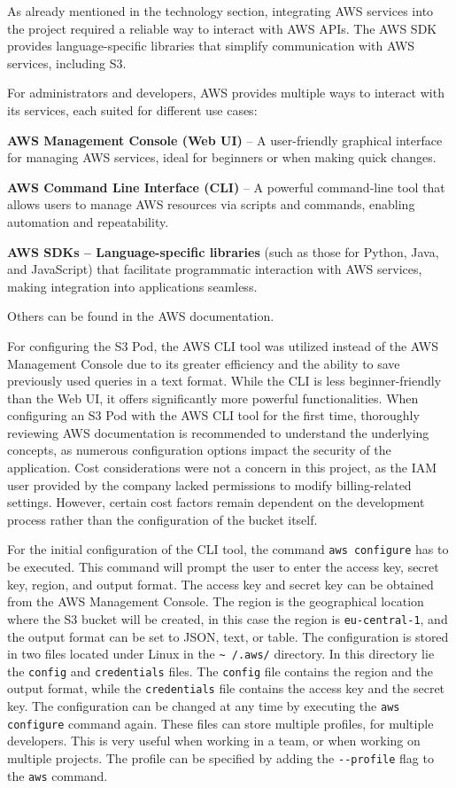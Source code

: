 As already mentioned in the technology section, integrating AWS services into the project required a reliable way to interact with AWS APIs. The AWS SDK provides language-specific libraries that simplify communication with AWS services, including S3.

For administrators and developers, AWS provides multiple ways to interact with its services, each suited for different use cases:
\begin{compactitem}
\item \textbf{AWS Management Console (Web UI)} – A user-friendly graphical interface for managing AWS services, ideal for beginners or when making quick changes.
\item \textbf{AWS Command Line Interface (CLI)} – A powerful command-line tool that allows users to manage AWS resources via scripts and commands, enabling automation and repeatability.
\item \textbf{AWS SDKs – Language-specific libraries} (such as those for Python, Java, and JavaScript) that facilitate programmatic interaction with AWS services, making integration into applications seamless.
\item Others can be found in the AWS documentation.
\end{compactitem}

For configuring the S3 Pod, the AWS CLI tool was utilized instead of the AWS Management Console due to its greater efficiency and the ability to save previously used queries in a text format. While the CLI is less beginner-friendly than the Web UI, it offers significantly more powerful functionalities. When configuring an S3 Pod with the AWS CLI tool for the first time, thoroughly reviewing AWS documentation is recommended to understand the underlying concepts, as numerous configuration options impact the security of the application. Cost considerations were not a concern in this project, as the IAM user provided by the company lacked permissions to modify billing-related settings. However, certain cost factors remain dependent on the development process rather than the configuration of the bucket itself.

For the initial configuration of the CLI tool, the command \texttt{aws configure} has to be executed. This command will prompt the user to enter the access key, secret key, region, and output format. The access key and secret key can be obtained from the AWS Management Console. The region is the geographical location where the S3 bucket will be created, in this case the region is \texttt{eu-central-1}, and the output format can be set to JSON, text, or table. The configuration is stored in two files located under Linux in the \texttt{\textasciitilde~/.aws/} directory. In this directory lie the \texttt{config} and \texttt{credentials} files. The \texttt{config} file contains the region and the output format, while the \texttt{credentials} file contains the access key and the secret key. The configuration can be changed at any time by executing the \texttt{aws configure} command again. These files can store multiple profiles, for multiple developers. This is very useful when working in a team, or when working on multiple projects. The profile can be specified by adding the \texttt{-{}-profile} flag to the \texttt{aws} command. 

